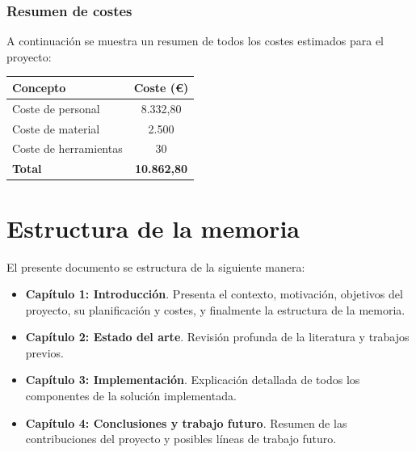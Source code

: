 \subsubsection{Resumen de costes}

A continuación se muestra un resumen de todos los costes estimados para el proyecto:

\begin{center}
\begin{tabular}{|l|c|}
\hline
\textbf{Concepto} & \textbf{Coste (€)} \\
\hline
Coste de personal & 8.332,80 \\
Coste de material & 2.500 \\
Coste de herramientas & 30 \\
\hline
\textbf{Total} & \textbf{10.862,80} \\
\hline
\end{tabular}
\end{center}
\section{Estructura de la memoria}

El presente documento se estructura de la siguiente manera:

\begin{itemize}
    \item \textbf{Capítulo 1: Introducción}. Presenta el contexto, motivación, objetivos del proyecto, su planificación y costes, y finalmente la estructura de la memoria.
    
    \item \textbf{Capítulo 2: Estado del arte}. Revisión profunda de la literatura y trabajos previos.

    
    
    \item \textbf{Capítulo 3: Implementación}. Explicación detallada de todos los componentes de la solución implementada.
    
    
    \item \textbf{Capítulo 4: Conclusiones y trabajo futuro}. Resumen de las contribuciones del proyecto y posibles líneas de trabajo futuro.
\end{itemize}
